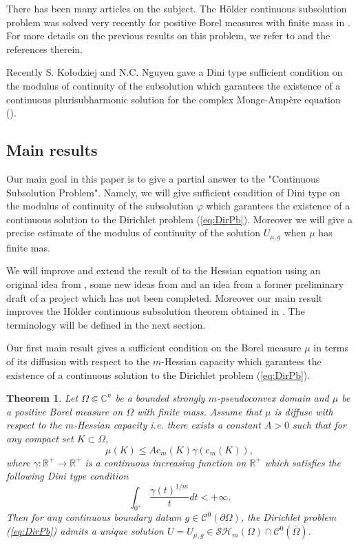 \documentclass[12pt]{amsart}
\theoremstyle{definition}
\numberwithin{theorem}{section}
\numberwithin{equation}{section}
\newcommand{\R}{\mathbb{R}}
\newcommand{\C}{\mathbb{C}}
\begin{document}
 There has been many articles on the subject.  The H\"older continuous subsolution problem was solved very recently for positive Borel measures with finite mass in \cite{BZ20} . For more details on the previous results  on this problem, we refer to \cite{BZ20} and the references therein.

Recently S. Ko\l odziej and  N.C. Nguyen gave a  Dini type sufficient condition on the modulus of continuity of the subsolution which garantees the existence of a continuous plurisubharmonic solution for the complex Monge-Amp\`ere equation (\cite{KN18}).

\subsection{Main results}
Our main goal in this paper is to give a partial answer to the  "Continuous Subsolution Problem". Namely, we will give  sufficient condition of Dini type on the modulus of  continuity of the subsolution $\varphi$ which garantees the existence of a  continuous solution to  the  Dirichlet problem (\ref{eq:DirPb}). Moreover we will  give a precise estimate of the modulus of continuity of the  solution $U_{\mu,g}$ when $\mu$ has finite mas.

We will improve and  extend the result of \cite{KN18} to the Hessian equation using an original idea from \cite{KN19}, some new ideas from \cite{BZ20} and an idea from a  former  preliminary draft of a project  which has not been completed. Moreover our main result improves the H\" older continuous subsolution theorem obtained  in \cite{BZ20}. The terminology will be defined in the next section. 

 \smallskip
 \smallskip
 Our first main result gives a sufficient condition on the Borel measure $\mu$ in terms of its diffusion with respect to the $m$-Hessian capacity which garantees the existence of a continuous solution to the Dirichlet problem (\ref{eq:DirPb}).
 
  \smallskip
 \smallskip
 
{\bf Theorem 1}. {\it  Let  $\Omega \Subset \C^n$ be a bounded strongly $m$-pseudoconvex  domain and $\mu$ be a positive Borel measure on $\Omega$ with finite mass. Assume that  $\mu$  is diffuse  with respect to the $m$-Hessian capacity i.e. there exists a constant $A > 0$ such that for any compact set $K \subset \Omega$,
$$
\mu (K) \leq A \text{c}_m (K) \gamma (\text{c}_m (K)),
$$
where $\gamma : \R^+ \longrightarrow \R^+$ is a continuous increasing function on $\R^+$ which  satisfies  the following  Dini type condition
 \begin{equation} \label{eq:DiniConditionMu}
\int_{0^+} \frac{\gamma (t)^{1 \slash m}}{t} d t < + \infty.
 \end{equation}
 Then   for any    continuous boundary datum $g \in \mathcal C^0 (\partial \Omega)$, the Dirichlet problem (\ref{eq:DirPb}) admits a unique solution  $U = U_{\mu,g} \in \mathcal{SH}_m (\Omega) \cap \mathcal C^0  (\bar{\Omega})$.}
\end{document}
